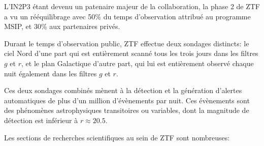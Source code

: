 \documentclass[../main/main.tex]{subfiles}
\begin{document}
L'IN2P3 étant devenu un patenaire majeur de la collaboration, la phase 2
de ZTF a vu un rééquilibrage avec 50\% du temps d'observation attribué
au programme MSIP, et 30\% aux partenaires privés.

Durant le temps d'observation public, ZTF effectue deux sondages distincts: le ciel
Nord d'une part qui est entièrement scanné tous les trois jours dans les
filtres $g$ et $r$, et le plan
Galactique d'autre part, qui lui est entièrement observé chaque nuit
également dans les filtres $g$ et $r$.

Ces deux sondages combinés mènent à la détection et la génération
d'alertes automatiques de plus d'un million d'évènements par nuit. Ces
évènements sont des phénomènes astrophysiques transitoires ou variables,
dont la magnitude de détection est inférieur à $r\approx 20.5$.

Les sections de recherches scientifiques au sein de ZTF sont nombreuses:
\end{document}
